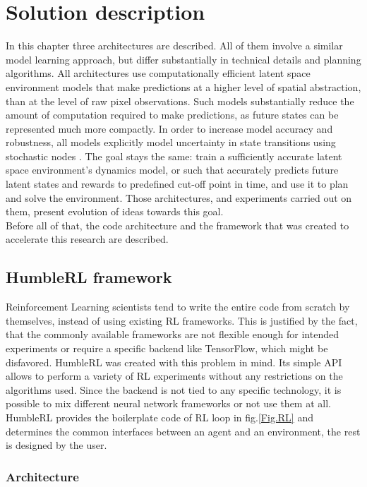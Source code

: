\section{Solution description} \label{Sec.SolutionDescription}

In this chapter three architectures are described. All of them involve a similar model learning approach, but differ substantially in technical details and planning algorithms. All architectures use computationally efficient latent space environment models that make predictions at a higher level of spatial abstraction, than at the level of raw pixel observations. Such models substantially reduce the amount of computation required to make predictions, as future states can be represented much more compactly. In order to increase model accuracy and robustness, all models explicitly model uncertainty in state transitions using stochastic nodes \cite{Algo.FastGenerativeModels}.
The goal stays the same: train a sufficiently accurate latent space environment's dynamics model, or such that accurately predicts future latent states and rewards to predefined cut-off point in time, and use it to plan and solve the environment. Those architectures, and experiments carried out on them, present evolution of ideas towards this goal. \\
Before all of that, the code architecture and the framework that was created to accelerate this research are described.

\subsection{HumbleRL framework}

Reinforcement Learning scientists tend to write the entire code from scratch by themselves, instead of using existing RL frameworks. This is justified by the fact, that the commonly available frameworks are not flexible enough for intended experiments or require a specific backend like TensorFlow, which might be disfavored.
HumbleRL \cite{Code.HRL} was created with this problem in mind. Its simple API allows to perform a variety of RL experiments without any restrictions on the algorithms used. Since the backend is not tied to any specific technology, it is possible to mix different neural network frameworks or not use them at all. HumbleRL provides the boilerplate code of RL loop in fig.\ref{Fig.RL} and determines the common interfaces between an agent and an environment, the rest is designed by the user.

\subsubsection{Architecture}

